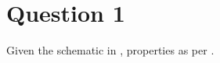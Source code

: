\chapter{Question 1}
\label{chap:q1}

Given the schematic in \cite{assign}, properties as per \citep{fluids}.
